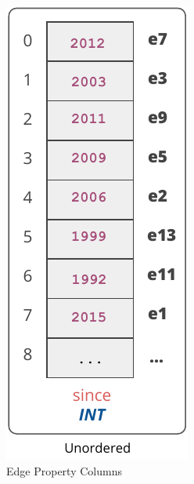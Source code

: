 \begin{figure}
	\vspace{-20pt}
	\hspace*{-20pt}
	\begin{subfigure}{0.45\textwidth}
		\vspace{14pt}
		\centering
		\includegraphics[scale=0.69]{img/sol1}
		\captionsetup{justification=centering}
		\vspace{12pt}
		\caption{Edge Property Columns}
		\label{fig:sol1}
	\end{subfigure}
	\begin{subfigure}{0.55\textwidth}
		\centering

\end{subfigure}
\end{figure}
